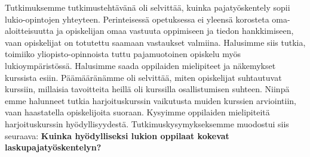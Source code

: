 Tutkimuksemme tutkimustehtävänä oli selvittää, kuinka pajatyöskentely sopii lukio-opintojen yhteyteen. Perinteisessä opetuksessa ei yleensä korosteta oma-aloitteisuutta ja opiskelijan omaa vastuuta oppimiseen ja tiedon hankkimiseen, vaan opiskelijat on totutettu saamaan vastaukset valmiina. Halusimme siis tutkia, toimiiko yliopisto-opinnoista tuttu pajamuotoinen opiskelu myös lukioympäristössä.
Halusimme saada oppilaiden mielipiteet ja näkemykset kurssista esiin. Päämääränämme oli selvittää, miten opiskelijat suhtautuvat kurssiin, millaisia tavoitteita heillä oli kurssilla osallistumisen suhteen.
Niinpä emme halunneet tutkia harjoituskurssin vaikutusta muiden kurssien arviointiin, vaan haastatella opiskelijoita suoraan. Kysyimme oppilaiden mielipiteitä harjoituskurssin hyödyllisyydestä.
Tutkimuskysymykseksemme muodostui siis seuraava:
\textbf{Kuinka hyödylliseksi lukion oppilaat kokevat laskupajatyöskentelyn?}

